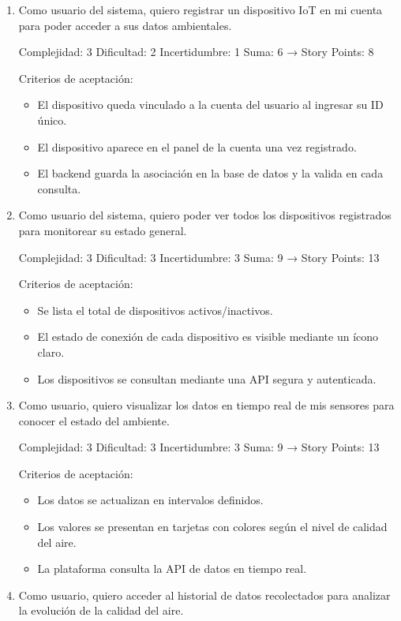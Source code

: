 \documentclass[
11pt, %
]{charter}
\begin{document}
\begin{enumerate}
\item
Como usuario del sistema, quiero registrar un dispositivo IoT en mi cuenta para poder acceder a sus datos ambientales.

Complejidad: 3
Dificultad: 2
Incertidumbre: 1
Suma: 6 → Story Points: 8

Criterios de aceptación:
\begin{itemize}
	\item El dispositivo queda vinculado a la cuenta del usuario al ingresar su ID único.
	\item El dispositivo aparece en el panel de la cuenta una vez registrado.
	\item El backend guarda la asociación en la base de datos y la valida en cada consulta.
\end{itemize}

\item
Como usuario del sistema, quiero poder ver todos los dispositivos registrados para monitorear su estado general.

Complejidad: 3
Dificultad: 3
Incertidumbre: 3
Suma: 9 → Story Points: 13

Criterios de aceptación:
\begin{itemize}
	\item Se lista el total de dispositivos activos/inactivos.
	\item El estado de conexión de cada dispositivo es visible mediante un ícono claro.
	\item Los dispositivos se consultan mediante una API segura y autenticada.
\end{itemize}


\item Como usuario, quiero visualizar los datos en tiempo real de mis sensores para conocer el estado del ambiente.

Complejidad: 3
Dificultad: 3
Incertidumbre: 3
Suma: 9 → Story Points: 13

Criterios de aceptación:
\begin{itemize}
	\item Los datos se actualizan en intervalos definidos.
	\item Los valores se presentan en tarjetas con colores según el nivel de calidad del aire.
	\item La plataforma consulta la API de datos en tiempo real.
\end{itemize}

\item Como usuario, quiero acceder al historial de datos recolectados para analizar la evolución de la calidad del aire.


\end{enumerate}
\end{document}
